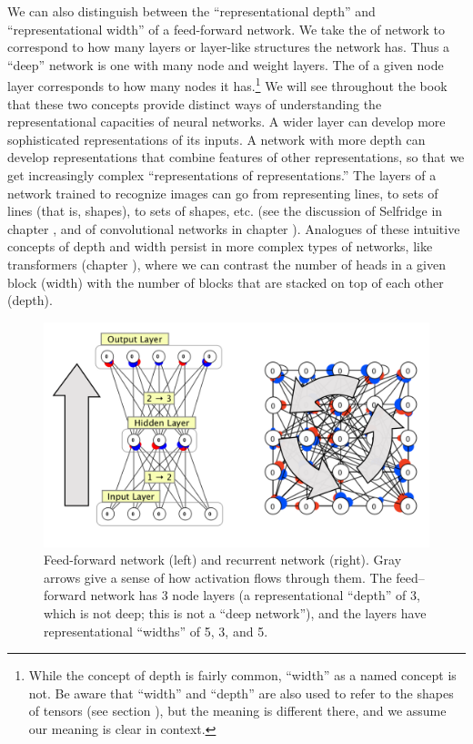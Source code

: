 We can also distinguish between the ``representational depth'' and ``representational width'' of a feed-forward network.  We take the  of network to correspond to how many layers or layer-like structures the network has. Thus a ``deep'' network is one with many node and weight layers. The  of a given node layer corresponds to how many nodes it has.\footnote{While the concept of depth is fairly common, ``width'' as a named concept is not. Be aware that ``width'' and ``depth'' are also used to refer to the shapes of tensors (see section ), but the meaning is different there, and we assume our meaning is clear in context.} We will see throughout the book that these two concepts provide distinct ways of understanding the representational capacities of neural networks. A wider layer can develop more sophisticated representations of its inputs. A network with more depth can develop representations that combine features of other representations, so that we get increasingly complex ``representations of representations.'' The layers of a network trained to recognize images can go from representing lines, to sets of lines (that is, shapes), to sets of shapes, etc. (see the discussion of Selfridge in chapter , and of convolutional networks in chapter ). Analogues of these intuitive concepts of depth and width persist in more complex types of networks, like transformers (chapter ), where we can contrast the number of heads in a given block (width) with the number of blocks that are stacked on top of each other (depth). 
 
\begin{figure}[h]
\centering
\includegraphics[scale=.7]{./images/NeuralNetTypes.png}
\caption[Simbrain screenshots with additional elements added by Pamela Payne.]{Feed-forward network (left) and recurrent network (right). Gray arrows give a sense of how activation flows through them. The feed--forward network has 3 node layers (a representational ``depth'' of 3, which is not deep; this is not a ``deep network''), and the layers have representational ``widths'' of 5, 3, and 5. }
\label{nn_types}
\end{figure}

